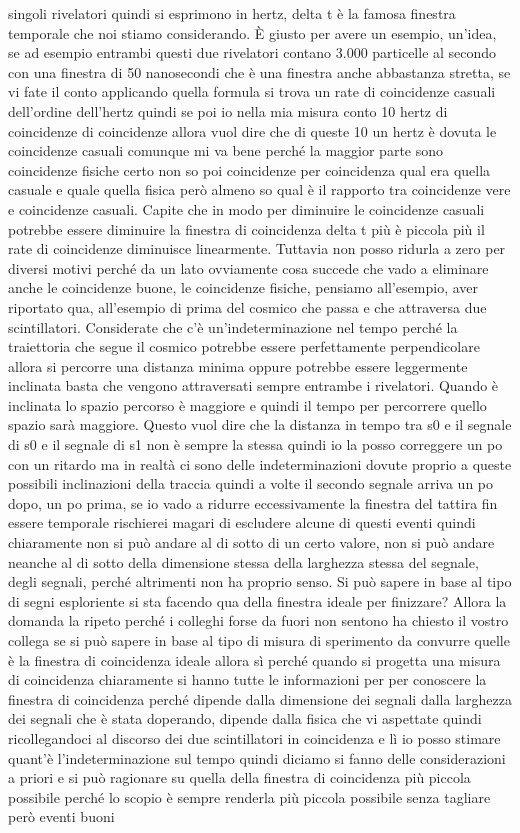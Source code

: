 {singoli rivelatori quindi si esprimono in hertz, delta t è la famosa finestra temporale che noi stiamo considerando. È giusto per avere un esempio, un'idea, se ad esempio entrambi questi due rivelatori contano 3.000 particelle al secondo con una finestra di 50 nanosecondi che è una finestra anche abbastanza stretta, se vi fate il conto applicando quella formula si trova un rate di coincidenze casuali dell'ordine dell'hertz quindi se poi io nella mia misura conto 10 hertz di coincidenze di coincidenze allora vuol dire che di queste 10 un hertz è dovuta le coincidenze casuali comunque mi va bene perché la maggior parte sono coincidenze fisiche certo non so poi coincidenze per coincidenza qual era quella casuale e quale quella fisica però almeno so qual è il rapporto tra coincidenze vere e coincidenze casuali. Capite che in modo per diminuire le coincidenze casuali potrebbe essere diminuire la finestra di coincidenza delta t più è piccola più il rate di coincidenze diminuisce linearmente. Tuttavia non posso ridurla a zero per diversi motivi perché da un lato ovviamente cosa succede che vado a eliminare anche le coincidenze buone, le coincidenze fisiche, pensiamo all'esempio, aver riportato qua, all'esempio di prima del cosmico che passa e che attraversa due scintillatori. Considerate che c'è un'indeterminazione nel tempo perché la traiettoria che segue il cosmico potrebbe essere perfettamente perpendicolare allora si percorre una distanza minima oppure potrebbe essere leggermente inclinata basta che vengono attraversati sempre entrambe i rivelatori. Quando è inclinata lo spazio percorso è maggiore e quindi il tempo per percorrere quello spazio sarà maggiore. Questo vuol dire che la distanza in tempo tra s0 e il segnale di s0 e il segnale di s1 non è sempre la stessa quindi io la posso correggere un po con un ritardo ma in realtà ci sono delle indeterminazioni dovute proprio a queste possibili inclinazioni della traccia quindi a volte il secondo segnale arriva un po dopo, un po prima, se io vado a ridurre eccessivamente la finestra del tattira fin essere temporale rischierei magari di escludere alcune di questi eventi quindi chiaramente non si può andare al di sotto di un certo valore, non si può andare neanche al di sotto della dimensione stessa della larghezza stessa del segnale, degli segnali, perché altrimenti non ha proprio senso. Si può sapere in base al tipo di segni esploriente si sta facendo qua della finestra ideale per finizzare? Allora la domanda la ripeto perché i colleghi forse da fuori non sentono ha chiesto il vostro collega se si può sapere in base al tipo di misura di sperimento da convurre quelle è la finestra di coincidenza ideale allora sì perché quando si progetta una misura di coincidenza chiaramente si hanno tutte le informazioni per per conoscere la finestra di coincidenza perché dipende dalla dimensione dei segnali dalla larghezza dei segnali che è stata doperando, dipende dalla fisica che vi aspettate quindi ricollegandoci al discorso dei due scintillatori in coincidenza e lì io posso stimare quant'è l'indeterminazione sul tempo quindi diciamo si fanno delle considerazioni a priori e si può ragionare su quella della finestra di coincidenza più piccola possibile perché lo scopio è sempre renderla più piccola possibile senza tagliare però eventi buoni }
